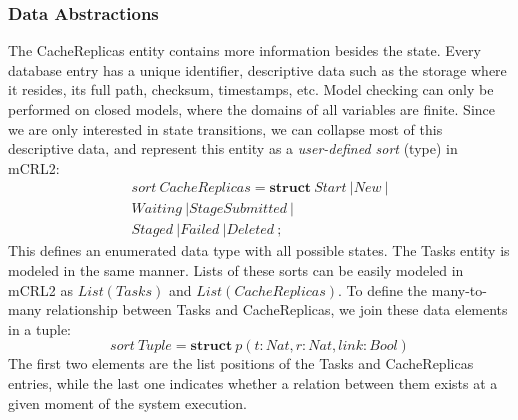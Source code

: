\documentclass[10pt,conference]{IEEEtran}
\begin{document}
\subsubsection{Data Abstractions}
The CacheReplicas entity contains more information besides the state.
Every database entry has a unique identifier, descriptive data such as 
the storage where it resides, its full path, checksum, timestamps, etc. 
Model checking can only be performed on closed models, where the domains
of all variables are finite. Since we are only interested in state transitions,
we can collapse most of this descriptive data, and represent this entity as a 
\textit{user-defined sort} (type) in mCRL2:
\begin{displaymath}
\begin{align*}
sort\ CacheReplicas = \textbf{struct}\ Start\ | 
			  New\ |  \\
		    Waiting\ | 
          StageSubmitted\ | \\
		      Staged\ | 
		      Failed\ | 
		  Deleted\ ;
\end{align*}
\end{displaymath}
This defines an enumerated data type with all possible states.
The Tasks entity is modeled in the same manner. Lists of these sorts can be easily modeled 
in mCRL2 as \begin{math}List(Tasks) \end{math} and 
\begin{math}List(CacheReplicas) \end{math}.
To define the many-to-many relationship between Tasks and CacheReplicas,
we join these data elements in a tuple:
\begin{displaymath}sort \ Tuple = \textbf{struct}\ p(t:Nat,r:Nat,link:Bool)
\end{displaymath}
The first two elements are the list positions of the Tasks and CacheReplicas
entries, while the last one indicates whether a relation between
them exists at a given moment of the system execution. 
\end{document}

